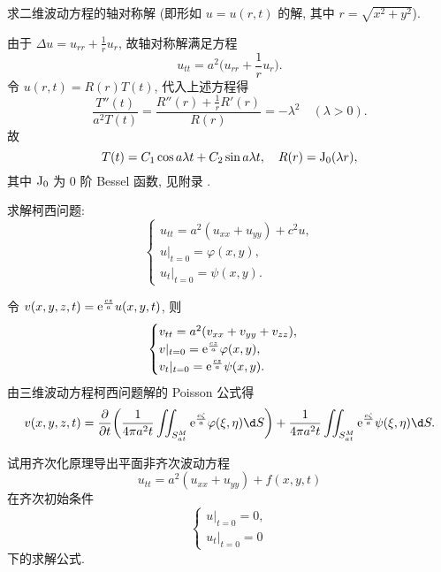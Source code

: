 \begin{exercise}
  求二维波动方程的轴对称解 (即形如 $u=u(r,t)$ 的解, 其中 $r=\sqrt{x^2+y^2}$).
\end{exercise}

\begin{solve}
  由于 $\Delta u = u_{rr} + \frac{1}{r}u_r$, 故轴对称解满足方程
  \[u_{tt} = a^2\biggl(u_{rr}+\frac{1}{r}u_r\biggr).\]
  令 $u(r,t) = R(r)T(t)$, 代入上述方程得
  \[\frac{T''(t)}{a^2T(t)} = \frac{R''(r)+\frac{1}{r}R'(r)}{R(r)} = -\lambda^2
    \quad (\lambda>0).\]
  故
  \[T(t) = C_1\cos a\lambda t + C_2\sin a\lambda t,
    \quad R(r) = {\rm J}_0(\lambda r),\]
  其中 ${\rm J}_0$ 为 0 阶 Bessel 函数, 见附录 \uppercase\expandafter{}.
\end{solve}


\begin{exercise}
  求解柯西问题:
  \[\begin{cases}
    u_{tt} = a^2(u_{xx}+u_{yy}) + c^2u, \\
    u|_{t=0} = \varphi(x,y), \\
    u_t|_{t=0} = \psi(x,y).
  \end{cases}\]
\end{exercise}

\begin{solve}
  令 $v(x,y,z,t) = \mathrm{e}^{\frac{cz}{a}} u(x,y,t)$, 则
  \[\begin{cases}
    v_{tt} = a^2(v_{xx} + v_{yy} + v_{zz}), \\
    v|_{t=0} = \mathrm{e}^{\frac{cz}{a}}\varphi(x,y), \\
    v_t|_{t=0} = \mathrm{e}^{\frac{cz}{a}}\psi(x,y).
  \end{cases}\]
  由三维波动方程柯西问题解的 Poisson 公式得
  \[v(x,y,z,t) = \frac{\partial}{\partial t}
    \biggl(\frac{1}{4\pi a^2t}\iint_{S_{at}^M} \e^{\frac{c\zeta}{a}}\varphi(\xi,\eta)\d S\biggr)
    + \frac{1}{4\pi a^2t}\iint_{S_{at}^M} \e^{\frac{c\zeta}{a}}\psi(\xi,\eta)\d S.\]
\end{solve}


\begin{exercise}[6]
  试用齐次化原理导出平面非齐次波动方程
  \[u_{tt} = a^2(u_{xx}+u_{yy})+f(x,y,t)\]
  在齐次初始条件
  \[\begin{cases}
    u|_{t=0} = 0, \\
    u_t|_{t=0} = 0
  \end{cases}\]
  下的求解公式.
\end{exercise}


